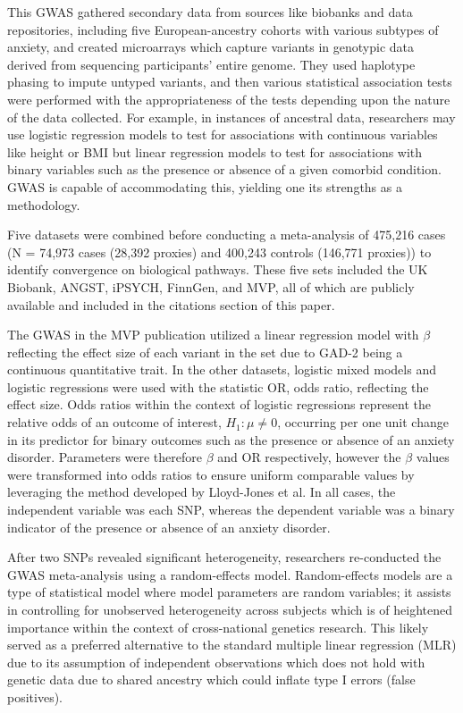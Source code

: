\documentclass[12pt]{article}
\begin{document}
This GWAS gathered secondary data from sources like biobanks and data repositories, including five European-ancestry cohorts with various subtypes of anxiety, and created microarrays which capture variants in genotypic data derived from sequencing participants’ entire genome. They used haplotype phasing to impute untyped variants, and then various statistical association tests were performed with the appropriateness of the tests depending upon the nature of the data collected. For example, in instances of ancestral data, researchers may use logistic regression models to test for associations with continuous variables like height or BMI but linear regression models to test for associations with binary variables such as the presence or absence of a given comorbid condition. GWAS is capable of accommodating this, yielding one its strengths as a methodology. \par

Five datasets were combined before conducting a meta-analysis of 475,216 cases (N = 74,973 cases (28,392 proxies) and 400,243 controls (146,771 proxies)) to identify convergence on biological pathways. These five sets included the UK Biobank, ANGST, iPSYCH, FinnGen, and MVP, all of which are publicly available and included in the citations section of this paper. \par

The GWAS in the MVP publication utilized a linear regression model with $\beta$ reflecting the effect size of each variant in the set due to GAD-2 being a continuous quantitative trait. In the other datasets, logistic mixed models and logistic regressions were used with the statistic OR, odds ratio, reflecting the effect size. Odds ratios within the context of logistic regressions represent the relative odds of an outcome of interest, $H_1: \mu \ne 0$, occurring per one unit change in its predictor for binary outcomes such as the presence or absence of an anxiety disorder. Parameters were therefore $\beta$ and OR respectively, however the $\beta$ values were transformed into odds ratios to ensure uniform comparable values by leveraging the method developed by Lloyd-Jones et al. In all cases, the independent variable was each SNP, whereas the dependent variable was a binary indicator of the presence or absence of an anxiety disorder. \par

After two SNPs revealed significant heterogeneity, researchers re-conducted the GWAS meta-analysis using a random-effects model. Random-effects models are a type of statistical model where model parameters are random variables; it assists in controlling for unobserved heterogeneity across subjects which is of heightened importance within the context of cross-national genetics research. This likely served as a preferred alternative to the standard multiple linear regression (MLR) due to its assumption of independent observations which does not hold with genetic data due to shared ancestry which could inflate type I errors (false positives). \par
\end{document}
